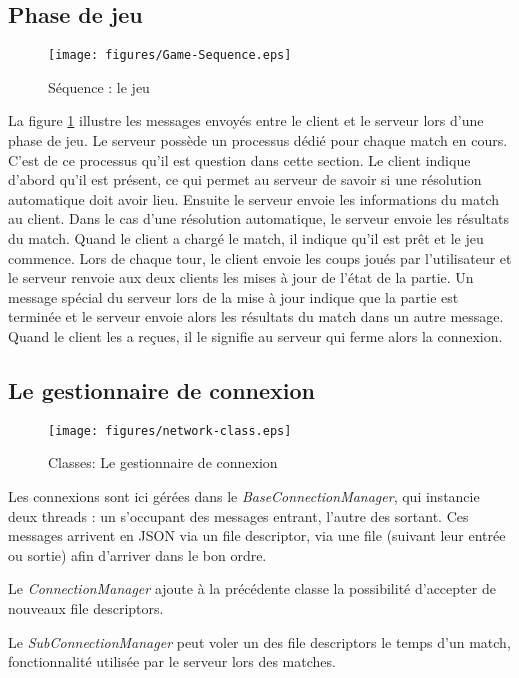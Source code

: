 \subsection{Phase de jeu}
\begin{figure}[h!]
  \centering
  \texttt{[image: figures/Game-Sequence.eps]}
  \caption{\label{fig:Sequence:Game} Séquence : le jeu}
\end{figure}
La figure \ref{fig:Sequence:Game} illustre les messages envoyés entre le \gls{client} et le \gls{serveur} 
lors d'une phase de jeu. 
Le serveur possède un processus dédié pour chaque match en cours. C'est de 
ce processus qu'il est question dans cette section.
Le client indique d'abord qu'il est présent, ce qui permet au serveur de 
savoir si une résolution automatique doit avoir lieu. 
Ensuite le serveur envoie les informations du match au client. Dans le cas 
d'une résolution automatique, le serveur envoie les résultats du match.
Quand le client a chargé le match, il indique qu'il est prêt et le jeu commence.
Lors de chaque tour, le client envoie les coups joués par l'utilisateur et le 
serveur renvoie aux deux clients les mises à jour de l'état de la partie.
Un message spécial du serveur lors de la mise à jour indique que la partie
est terminée et le serveur envoie alors les résultats du match dans un autre 
message. Quand le client les a reçues, il le signifie au serveur qui ferme 
alors la connexion.

\subsection{Le gestionnaire de connexion}
\begin{figure}[h!]
  \centering
  \texttt{[image: figures/network-class.eps]}
  \caption{\label{fig:Class:Network} Classes: Le gestionnaire de connexion}
\end{figure}

Les connexions sont ici gérées dans le \emph{BaseConnectionManager}, qui instancie deux threads : un s'occupant des messages entrant, l'autre des sortant. Ces messages arrivent en JSON via un file descriptor, via une file (suivant leur entrée ou sortie) afin d'arriver dans le bon ordre.

Le \emph{ConnectionManager} ajoute à la précédente classe la possibilité d'accepter de nouveaux file descriptors.

Le \emph{SubConnectionManager} peut voler un des file descriptors le temps d'un match, fonctionnalité utilisée par le serveur lors des matches.



